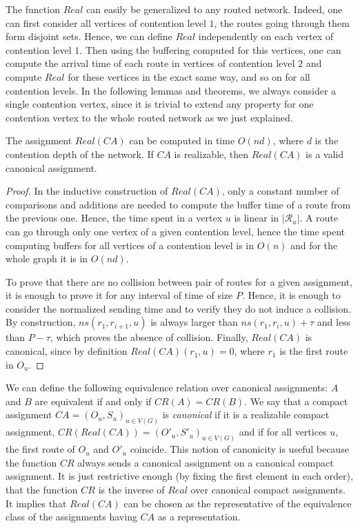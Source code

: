 \documentclass[english]{article}
\begin{document}
The function $Real$ can easily be generalized to any routed network. Indeed, one can first consider all vertices of contention level $1$, the routes going through them form disjoint sets. Hence, we can define $Real$ independently on each vertex of contention level $1$. 
Then using the buffering computed for this vertices, one can compute the arrival time of each route in vertices of contention level $2$ and compute $Real$ for these vertices in the exact same way, and so on for all contention levels. In the following lemmas and theorems, we always consider a single contention vertex, since it is trivial to extend any property for one contention vertex to the whole routed network as we just explained. 

\begin{lemma}\label{lemma:canonical}
The assignment $Real(CA)$ can be computed in time $O(nd)$, where $d$ is the contention
depth of the network. If $CA$ is realizable, then $Real(CA)$ is a valid canonical assignment.
\end{lemma}
\begin{proof}
In the inductive construction of $Real(CA)$,  only a constant number of comparisons and additions are needed to compute the 
buffer time of a route from the previous one. Hence, the time spent in a vertex $u$ is linear in $|\mathcal{R}_u|$. 
A route can go through only one vertex of a given contention level, hence the time spent computing buffers for all vertices
of a contention level is in $O(n)$ and for the whole graph it is in $O(nd)$.

To prove that there are no collision between pair of routes for a given assignment, it is enough to 
prove it for any interval of time of size $P$. Hence, it is enough to consider the normalized sending time and to verify
they do not induce a collision. By construction,  $ns(r_1,r_{i+1},u)$ is always larger than $ns(r_1,r_{i},u) + \tau$ and less 
than $P - \tau$, which proves the absence of collision. Finally, $Real(CA)$ is canonical, since by definition $Real(CA)(r_1,u) = 0$,
where $r_1$ is the first route in $O_u$.
\end{proof}

We can define the following equivalence relation over canonical assignments: $A$ and $B$ are equivalent if and only if $CR(A) = CR(B)$.
We say that a compact assignment $CA = (O_u,S_u)_{u \in V(G)}$ is \emph{canonical} if it is a realizable compact assignment, $CR(Real(CA)) = (O'_u,S'_u)_{u \in V(G)}$ and if for all vertices $u$, the first route of $O_u$ and $O'_u$ coincide. This notion of canonicity is useful because the function 
$CR$ always sends a canonical assignment on a canonical compact assignment. It is just restrictive enough (by fixing the first element in each order),
that the function $CR$ is the inverse of $Real$ over canonical compact assignments. It implies that
$Real(CA)$ can be chosen as the representative of the equivalence class of the assignments having $CA$ as a representation.
\end{document}
